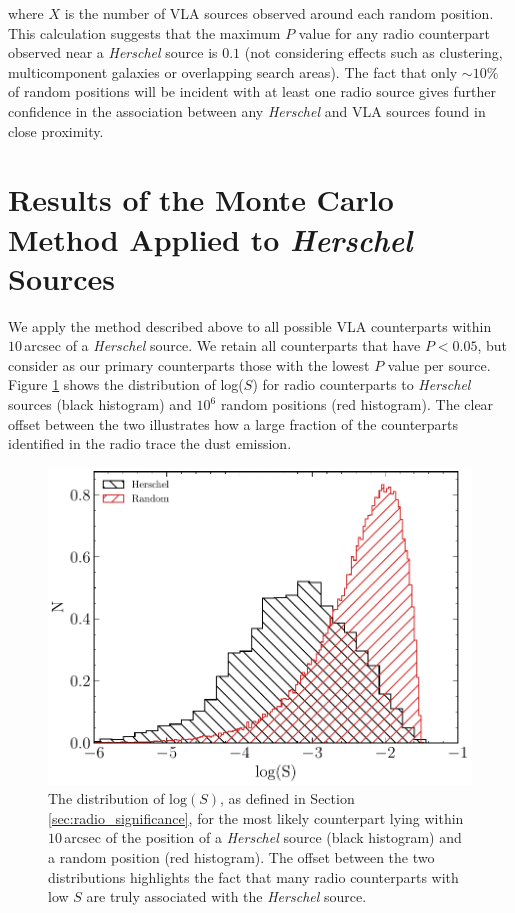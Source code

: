 \noindent where $X$ is the number of VLA sources observed around each random position. This calculation suggests that the maximum $P$ value for any radio counterpart observed near a \textit{Herschel} source is $0.1$ (not considering effects such as clustering, multicomponent galaxies or overlapping search areas). The fact that only $\sim 10\%$ of random positions will be incident with at least one radio source gives further confidence in the association between any \textit{Herschel} and VLA sources found in close proximity.

\section{Results of the Monte Carlo Method Applied to \textit{Herschel} Sources}

We apply the method described above to all possible VLA counterparts within $10\,$arcsec of a \textit{Herschel} source. We retain all counterparts that have $P < 0.05$, but consider as our primary counterparts those with the lowest $P$ value per source. Figure \ref{fig:ds_distributions} shows the distribution of log($S$) for radio counterparts to \textit{Herschel} sources (black histogram) and $10^6$ random positions (red histogram). The clear offset between the two illustrates how a large fraction of the counterparts identified in the radio trace the dust emission.

\begin{figure}
	\centering
	\includegraphics[width=0.8\columnwidth]{Figures/ds_distributions.pdf}
	\caption[Distribution of $\textrm{log}(S)$ for \textit{Herschel} sources and random positions]{The distribution of $\textrm{log}(S)$, as defined in Section \ref{sec:radio_significance}, for the most likely counterpart lying within $10\,$arcsec of the position of a \textit{Herschel} source (black histogram) and a random position (red histogram). The offset between the two distributions highlights the fact that many radio counterparts with low $S$ are truly associated with the \textit{Herschel} source.}
	\label{fig:ds_distributions}
\end{figure}

